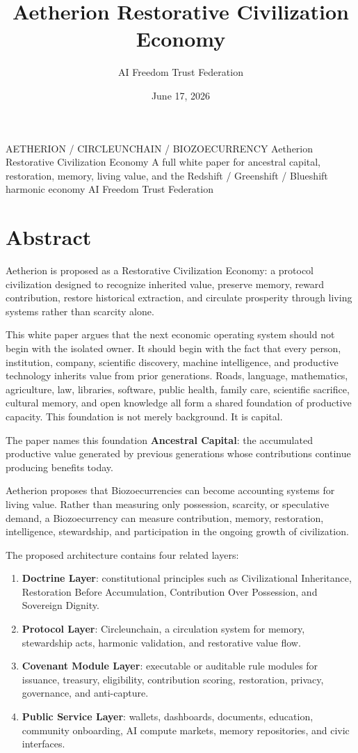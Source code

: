 \documentclass[12pt]{article}
\title{Aetherion Restorative Civilization Economy}
\author{AI Freedom Trust Federation}
\date{June 17, 2026}
\begin{document}
\aftTitlePage
  {AETHERION / CIRCLEUNCHAIN / BIOZOECURRENCY}
  {Aetherion Restorative Civilization Economy}
  {A full white paper for ancestral capital, restoration, memory, living value, and the Redshift / Greenshift / Blueshift harmonic economy}
  {AI Freedom Trust Federation}

\tableofcontents
\newpage

\section{Abstract}

Aetherion is proposed as a Restorative Civilization Economy: a protocol civilization designed to recognize inherited value, preserve memory, reward contribution, restore historical extraction, and circulate prosperity through living systems rather than scarcity alone.

This white paper argues that the next economic operating system should not begin with the isolated owner. It should begin with the fact that every person, institution, company, scientific discovery, machine intelligence, and productive technology inherits value from prior generations. Roads, language, mathematics, agriculture, law, libraries, software, public health, family care, scientific sacrifice, cultural memory, and open knowledge all form a shared foundation of productive capacity. This foundation is not merely background. It is capital.

The paper names this foundation \textbf{Ancestral Capital}: the accumulated productive value generated by previous generations whose contributions continue producing benefits today.

Aetherion proposes that Biozoecurrencies can become accounting systems for living value. Rather than measuring only possession, scarcity, or speculative demand, a Biozoecurrency can measure contribution, memory, restoration, intelligence, stewardship, and participation in the ongoing growth of civilization.

The proposed architecture contains four related layers:

\begin{enumerate}
  \item \textbf{Doctrine Layer}: constitutional principles such as Civilizational Inheritance, Restoration Before Accumulation, Contribution Over Possession, and Sovereign Dignity.
  \item \textbf{Protocol Layer}: Circleunchain, a circulation system for memory, stewardship acts, harmonic validation, and restorative value flow.
  \item \textbf{Covenant Module Layer}: executable or auditable rule modules for issuance, treasury, eligibility, contribution scoring, restoration, privacy, governance, and anti-capture.
  \item \textbf{Public Service Layer}: wallets, dashboards, documents, education, community onboarding, AI compute markets, memory repositories, and civic interfaces.
\end{enumerate}
\end{document}
